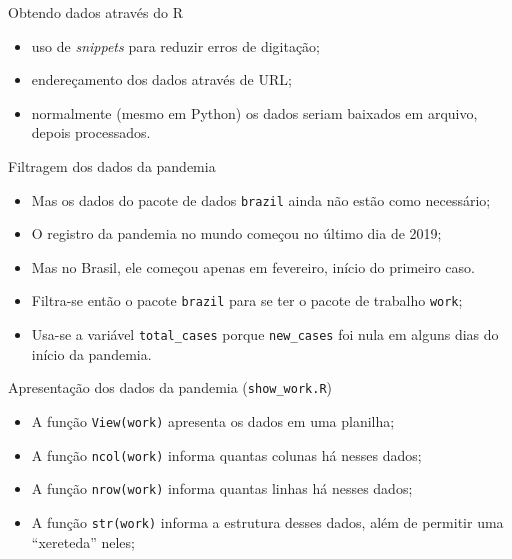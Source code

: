 \documentclass[a4paper,10pt]{beamer}
\begin{document}
\begin{frame}[fragile]{Obtendo dados através do R}

  
  \begin{itemize}
      \item uso de {\em snippets} para reduzir erros de digitação;
      \item endereçamento dos dados através de URL;
      \item normalmente (mesmo em Python) os dados seriam baixados em arquivo,
	  depois processados.
  \end{itemize}

\end{frame}

\begin{frame}{Filtragem dos dados da pandemia}
  
  
  \begin{itemize}
      \item Mas os dados do pacote de dados {\tt brazil} ainda não estão como 
	  necessário;
      \item O registro da pandemia no mundo começou no último dia de 2019;
      \item Mas no Brasil, ele começou apenas em fevereiro, início do 
	  primeiro caso.	  
      \item Filtra-se então o pacote {\tt brazil} para se ter o pacote de 
	  trabalho {\tt work};
      \item Usa-se a variável {\tt total\_cases} porque {\tt new\_cases} foi 
	  nula em alguns dias do início da pandemia.
  \end{itemize}

\end{frame}

\begin{frame}{Apresentação dos dados da pandemia ({\tt show\_work.R}) }
  
  
  \begin{itemize}
      \item A função {\tt View(work)} apresenta os dados em uma 
	  planilha;
      \item A função  {\tt ncol(work)} informa quantas colunas há nesses
	  dados;
      \item A função  {\tt nrow(work)} informa quantas linhas há nesses
	  dados;
      \item A função  {\tt str(work)} informa a estrutura desses 
	  dados, além de permitir uma ``xereteda'' neles;
  \end{itemize}

\end{frame}
\end{document}
